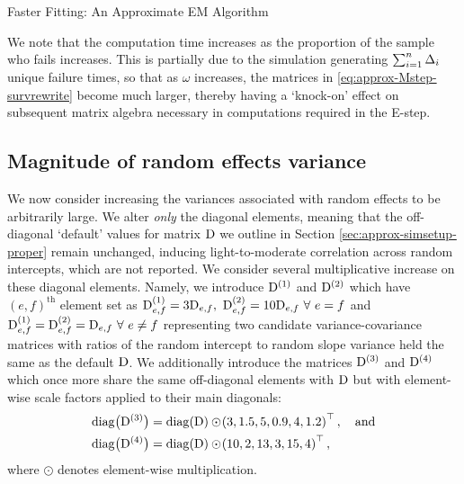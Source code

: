\begin{chapter}{\label{cha:approx}Faster Fitting: An Approximate EM Algorithm}
  \begin{remark}
      We note that the computation time increases as the proportion of the sample who fails increases. This is partially due to the simulation generating $\sum_{i=1}^n\Delta_i$ unique failure times, so that as $\omega$ increases, the matrices in \eqref{eq:approx-Mstep-survrewrite} become much larger, thereby having a `knock-on' effect on subsequent matrix algebra necessary in computations required in the E-step.
  \end{remark}
  
  \subsection{Magnitude of random effects variance}\label{sec:approx-sims-D}
  We now consider increasing the variances associated with random effects to be arbitrarily large. We alter \textit{only} the diagonal elements, meaning that the off-diagonal `default' values for matrix $\mathrm{D}$ we outline in Section \ref{sec:approx-simsetup-proper} remain unchanged, inducing light-to-moderate correlation across random intercepts, which are not reported. We consider several multiplicative increase on these diagonal elements. Namely, we introduce $\mathrm{D}^{(1)}$ and $\mathrm{D}^{(2)}$ which have $(e,f)^{\mathrm{th}}$ element set as $\D^{(1)}_{e,f}=3\D_{e,f},\ \D^{(2)}_{e,f}=10\D_{e,f}\ \forall\ e=f$ and $\D^{(1)}_{e,f}=\D^{(2)}_{e,f}=\D_{e,f}\ \forall\ e\neq f$ representing two candidate variance-covariance matrices with ratios of the random intercept to random slope variance held the same as the default $\mathrm{D}$. We additionally introduce the matrices $\mathrm{D}^{(3)}$ and $\mathrm{D}^{(4)}$ which once more share the same off-diagonal elements with $\mathrm{D}$ but with element-wise scale factors applied to their main diagonals:
  \begin{align*}
      \mathrm{diag}\big(\mathrm{D}^{(3)}\big)&=\mathrm{diag}\!\left(\mathrm{D}\right)\odot\!\left(3,1.5,5,0.9,4,1.2\right)^\top,\quad\mathrm{and}\\
      \mathrm{diag}\big(\mathrm{D}^{(4)}\big)&=\mathrm{diag}\!\left(\mathrm{D}\right)\odot\!\left(10,2,13,3,15,4\right)^\top,
  \end{align*}
  where $\odot$ denotes element-wise multiplication.
  

\end{chapter}

